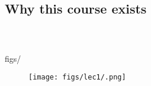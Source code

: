 \setchapterabstract{}

\vspace{-10cm}
\chapter{}

\vspace{-2cm}


{\chaptoc\noindent\begin{minipage}[inner sep=0,outer sep=0]{0.9\linewidth}\section{Why this course exists}\end{minipage}}
\\
\Remark{
}

\subsection{
}
\MarginImageWithNote
  {figs/}
  {}
  {
  }

\begin{figure}[htbp]
  \centering
  \texttt{[image: figs/lec1/.png]}
  \caption{}
  \label{fig:}
\end{figure}

\clearpage

